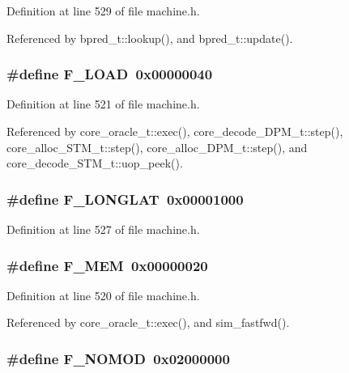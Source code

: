 Definition at line 529 of file machine.h.

Referenced by bpred\_\-t::lookup(), and bpred\_\-t::update().
\subsubsection[{F\_\-LOAD}]{\setlength{\rightskip}{0pt plus 5cm}\#define F\_\-LOAD~0x00000040}\label{machine_8h_a696f4e8edb147969a12513f7b195e9a}




Definition at line 521 of file machine.h.

Referenced by core\_\-oracle\_\-t::exec(), core\_\-decode\_\-DPM\_\-t::step(), core\_\-alloc\_\-STM\_\-t::step(), core\_\-alloc\_\-DPM\_\-t::step(), and core\_\-decode\_\-STM\_\-t::uop\_\-peek().
\subsubsection[{F\_\-LONGLAT}]{\setlength{\rightskip}{0pt plus 5cm}\#define F\_\-LONGLAT~0x00001000}\label{machine_8h_a7656182969e773cb0aefcab80303b78}




Definition at line 527 of file machine.h.
\subsubsection[{F\_\-MEM}]{\setlength{\rightskip}{0pt plus 5cm}\#define F\_\-MEM~0x00000020}\label{machine_8h_a6be3e11431119e8d3ab666ab4f5ded7}




Definition at line 520 of file machine.h.

Referenced by core\_\-oracle\_\-t::exec(), and sim\_\-fastfwd().
\subsubsection[{F\_\-NOMOD}]{\setlength{\rightskip}{0pt plus 5cm}\#define F\_\-NOMOD~0x02000000}\label{machine_8h_9d3b1c5f1b043755d074054367cd3405}




